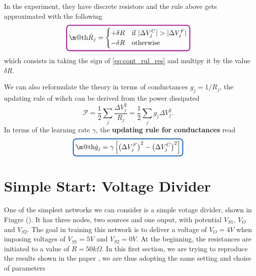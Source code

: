 \documentclass[11pt]{article}
\makeatletter
\newcommand*{\boxcolor}{Mulberry}
\renewcommand{\boxed}[1]{\textcolor{\boxcolor}{%
    \tikz[baseline={([yshift=-1ex]current bounding box.center)}] \node[rectangle, minimum width=1ex,rounded corners,draw, line width=1.5pt] {\normalcolor\m@th$\displaystyle#1$};}}
\newcommand*{\boxcolorc}{NavyBlue}
\newcommand{\boxedc}[1]{\textcolor{\boxcolorc}{%
    \tikz[baseline={([yshift=-1ex]current bounding box.center)}] \node[rectangle, minimum width=1ex,rounded corners,draw, line width=1.5pt] {\normalcolor\m@th$\displaystyle#1$};}}
\newcommand{\cond}[1]{\textcolor{NavyBlue}{\bf{#1}}}
\makeatother
\begin{document}
In the experiment, they have discrete resistors and the rule above gets approximated with the following 
\begin{equation}
\boxed{\dot{R}_j = \begin{cases} 
    +\delta R & \text{if} \ |\Delta V^{C}_{j}|>|\Delta V^{F}_{j}| \\
    -\delta R & \text{otherwise}
 \end{cases}}
\label{eq:disc_rul_res}
\end{equation}
which consists in taking the sign of \cref{eq:cont_rul_res} and multipy it by the value $\delta R$.

We can also reformulate the theory in terms of conductances $g_j = 1/R_j$, the updating rule of wihch can be derived from the power dissipated
\[
\mathcal{P}  = \frac{1}{2} \sum_{j} \frac{\Delta V_j^2}{R_j} = \frac{1}{2} \sum_{j} g_j \Delta V_j^2.
\]
In terms of the learning rate $\gamma$, the \cond{updating rule for conductances} read
\begin{equation}
    \boxedc{\dot{g}_j = \gamma \left[ \left( \Delta V_{j}^{F}\right)^2 - \left( \Delta V_{j}^{C}\right)^2 \right] }   
\end{equation}

\section{Simple Start: Voltage Divider}

One of the simplest networks we can consider is a simple votage divider, shown in Fiugre (). It has three nodes, two sources and one ouput, with potential $V_{S1}$, $V_{O}$ and $V_{S2}$. The goal in training this network is to deliver a voltage of $V_{O} = 4V$ when imposing voltages of $V_{S1}=5V$ and $V_{S2}=0V$. At the beginning, the resistances are initiated to a value of $R = 50 k \Omega$. In this first section, we are trying to reproduce the results shown in the paper \cite{Dillavou}, we are thus adopting the same setting and choise of parameters

\newpage
\printbibliography
\end{document}
